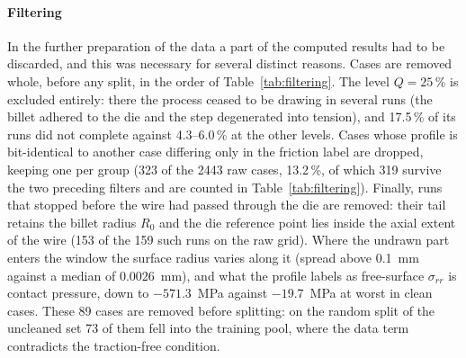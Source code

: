 \paragraph{Filtering}
In the further preparation of the data a part of the computed results had to be discarded, and this was necessary for several distinct reasons. Cases are removed whole, before any split, in the order of Table~\ref{tab:filtering}. The level $Q=25\,\%$ is excluded entirely: there the process ceased to be drawing in several runs (the billet adhered to the die and the step degenerated into tension), and 17.5\,\% of its runs did not complete against 4.3--6.0\,\% at the other levels. %
Cases whose profile is bit-identical to another case differing only in the friction label are dropped, keeping one per group (323 of the 2443 raw cases, 13.2\,\%, of which 319 survive the two preceding filters and are counted in Table~\ref{tab:filtering}). %
Finally, runs that stopped before the wire had passed through the die are removed: their tail retains the billet radius $R_0$ and the die reference point lies inside the axial extent of the wire (153 of the 159 such runs on the raw grid). %
Where the undrawn part enters the window the surface radius varies along it (spread above 0.1~mm against a median of 0.0026~mm), and what the profile labels as free-surface $\sigma_{rr}$ is contact pressure, down to $-571.3$~MPa against $-19.7$~MPa at worst in clean cases. %
These 89 cases are removed before splitting: on the random split of the uncleaned set 73 of them fell into the training pool, where the data term contradicts the traction-free condition. %
